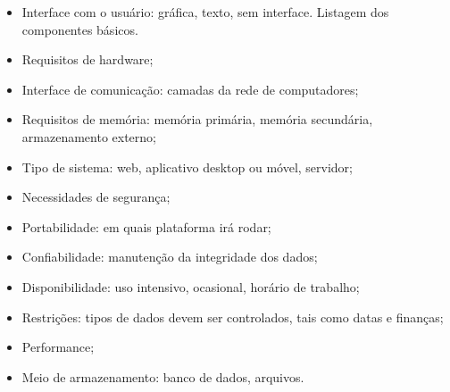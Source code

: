 \begin{itemize}
\item Interface com o usuário: gráfica, texto, sem interface. Listagem
  dos componentes básicos.
\item Requisitos de hardware;
\item Interface de comunicação: camadas da rede de computadores;
\item Requisitos de memória: memória primária, memória secundária,
  armazenamento externo;
\item Tipo de sistema: web, aplicativo desktop ou móvel, servidor;
\item Necessidades de segurança;
\item Portabilidade: em quais plataforma irá rodar;
\item Confiabilidade: manutenção da integridade dos dados;
\item Disponibilidade: uso intensivo, ocasional, horário de trabalho;
\item Restrições: tipos de dados devem ser controlados, tais como datas e finanças;
\item Performance;
\item Meio de armazenamento: banco de dados, arquivos.
\end{itemize}

